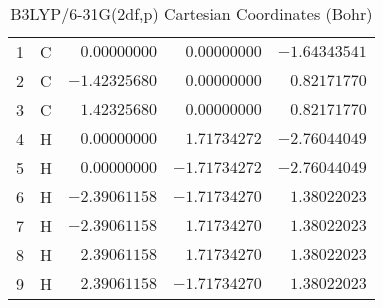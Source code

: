 \documentclass[10pt,oneside]{article}
\begin{document}
\begin{table}[h!]
\centering
\caption{B3LYP/6-31G(2df,p) Cartesian Coordinates (Bohr)}
\begin{tabular}{llrrr}
1  & C  & $ 0.00000000$ & $ 0.00000000$ & $-1.64343541$ \\
2  & C  & $-1.42325680$ & $ 0.00000000$ & $ 0.82171770$ \\
3  & C  & $ 1.42325680$ & $ 0.00000000$ & $ 0.82171770$ \\
4  & H  & $ 0.00000000$ & $ 1.71734272$ & $-2.76044049$ \\
5  & H  & $ 0.00000000$ & $-1.71734272$ & $-2.76044049$ \\
6  & H  & $-2.39061158$ & $-1.71734270$ & $ 1.38022023$ \\
7  & H  & $-2.39061158$ & $ 1.71734270$ & $ 1.38022023$ \\
8  & H  & $ 2.39061158$ & $ 1.71734270$ & $ 1.38022023$ \\
9  & H  & $ 2.39061158$ & $-1.71734270$ & $ 1.38022023$ \\
\end{tabular}
\end{table}

\clearpage
\end{document}
